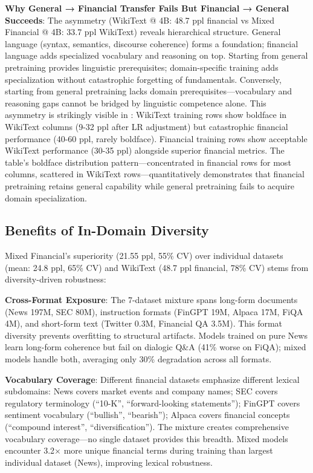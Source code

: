 \textbf{Why General → Financial Transfer Fails But Financial → General Succeeds}: The asymmetry (WikiText @ 4B: 48.7 ppl financial vs Mixed Financial @ 4B: 33.7 ppl WikiText) reveals hierarchical structure. General language (syntax, semantics, discourse coherence) forms a foundation; financial language adds specialized vocabulary and reasoning on top. Starting from general pretraining provides linguistic prerequisites; domain-specific training adds specialization without catastrophic forgetting of fundamentals. Conversely, starting from general pretraining lacks domain prerequisites—vocabulary and reasoning gaps cannot be bridged by linguistic competence alone. This asymmetry is strikingly visible in : WikiText training rows show boldface in WikiText columns (9-32 ppl after LR adjustment) but catastrophic financial performance (40-60 ppl, rarely boldface). Financial training rows show acceptable WikiText performance (30-35 ppl) alongside superior financial metrics. The table's boldface distribution pattern—concentrated in financial rows for most columns, scattered in WikiText rows—quantitatively demonstrates that financial pretraining retains general capability while general pretraining fails to acquire domain specialization.

\subsection{Benefits of In-Domain Diversity}

Mixed Financial's superiority (21.55 ppl, 55\% CV) over individual datasets (mean: 24.8 ppl, 65\% CV) and WikiText (48.7 ppl financial, 78\% CV) stems from diversity-driven robustness:

\textbf{Cross-Format Exposure}: The 7-dataset mixture spans long-form documents (News 197M, SEC 80M), instruction formats (FinGPT 19M, Alpaca 17M, FiQA 4M), and short-form text (Twitter 0.3M, Financial QA 3.5M). This format diversity prevents overfitting to structural artifacts. Models trained on pure News learn long-form coherence but fail on dialogic Q\&A (41\% worse on FiQA); mixed models handle both, averaging only 30\% degradation across all formats.

\textbf{Vocabulary Coverage}: Different financial datasets emphasize different lexical subdomains: News covers market events and company names; SEC covers regulatory terminology (``10-K'', ``forward-looking statements''); FinGPT covers sentiment vocabulary (``bullish'', ``bearish''); Alpaca covers financial concepts (``compound interest'', ``diversification''). The mixture creates comprehensive vocabulary coverage—no single dataset provides this breadth. Mixed models encounter 3.2$\times$ more unique financial terms during training than largest individual dataset (News), improving lexical robustness.

